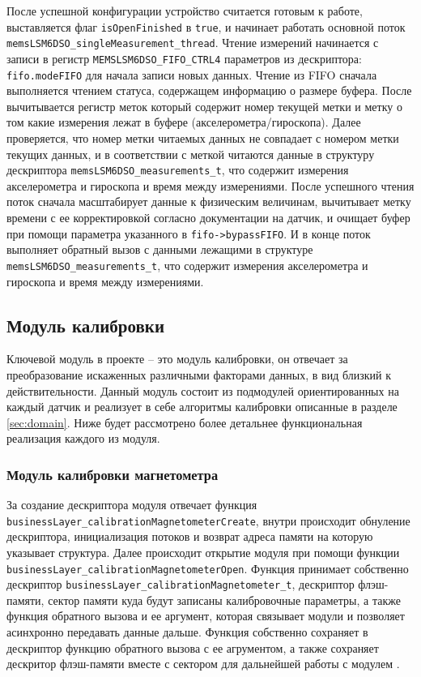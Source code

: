 После успешной конфигурации устройство считается готовым к работе, выставляется флаг \lstinline{isOpenFinished} в \lstinline{true}, и начинает
работать основной поток \lstinline{memsLSM6DSO_singleMeasurement_thread}. Чтение измерений начинается с записи в регистр \lstinline{MEMSLSM6DSO_FIFO_CTRL4}
параметров из дескриптора: \lstinline{fifo.modeFIFO} для начала записи новых данных.
Чтение из FIFO сначала выполняется чтением статуса, содержащем информацию о размере буфера. После вычитывается регистр меток
который содержит номер текущей метки и метку о том какие измерения лежат в буфере (акселерометра/гироскопа). 
Далее проверяется, что номер метки читаемых данных не совпадает с номером метки текущих данных,
и в соответствии с меткой читаются данные в структуру дескриптора \lstinline{memsLSM6DSO_measurements_t}, что содержит измерения акселерометра и гироскопа и время между измерениями.
После успешного чтения поток сначала масштабирует данные к физическим величинам, вычитывает
метку времени с ее корректировкой согласно документации на датчик, и очищает буфер при помощи параметра указанного в \lstinline{fifo->bypassFIFO}.
И в конце поток выполняет обратный вызов с данными лежащими в структуре \lstinline{memsLSM6DSO_measurements_t}, что содержит измерения акселерометра и гироскопа и время между измерениями.

\subsection{Модуль калибровки}

Ключевой модуль в проекте -- это модуль калибровки, он отвечает за преобразование искаженных различными факторами данных, в вид близкий к действительности. 
Данный модуль состоит из подмодулей ориентированных на каждый датчик и реализует в себе алгоритмы калибровки описанные в разделе \ref{sec:domain}.
Ниже будет рассмотрено более детальнее функциональная реализация каждого из модуля.

\subsubsection{Модуль калибровки магнетометра}

За создание дескриптора модуля отвечает функция \lstinline{businessLayer_calibrationMagnetometerCreate}, внутри происходит обнуление дескриптора,
инициализация потоков и возврат адреса памяти на которую указывает структура. Далее происходит открытие модуля при помощи функции 
\lstinline{businessLayer_calibrationMagnetometerOpen}. Функция принимает собственно дескриптор \lstinline{businessLayer_calibrationMagnetometer_t},
дескриптор флэш-памяти, сектор памяти куда будут записаны калибровочные параметры, а также функция обратного вызова и ее аргумент, 
которая связывает модули и позволяет асинхронно передавать данные дальше. Функция собственно сохраняет в дескриптор функцию обратного вызова с ее агрументом,
а также сохраняет дескритор флэш-памяти вместе с сектором для дальнейшей работы с модулем \moduleFlashMemory. 

